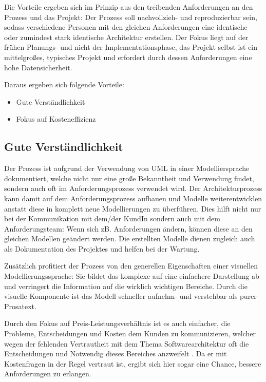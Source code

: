 Die Vorteile ergeben sich im Prinzip aus den treibenden Anforderungen an den Prozess und das Projekt: Der Prozess soll nachvollzieh- und reproduzierbar sein, sodass verschiedene Personen mit den gleichen Anforderungen eine identische oder zumindest stark identische Architektur erstellen. Der Fokus liegt auf der frühen Planungs- und nicht der Implementationsphase, das Projekt selbst ist ein mittelgroßes, typisches Projekt und erfordert durch dessen Anforderungen eine hohe Datensicherheit.

Daraus ergeben sich folgende Vorteile:

\begin{itemize}
  \item Gute Verständlichkeit
  \item Fokus auf Kosteneffizienz
\end{itemize}

\subsection{Gute Verständlichkeit}
Der Prozess ist aufgrund der Verwendung von UML in einer Modelliersprache dokumentiert, welche nicht nur eine große Bekanntheit und Verwendung findet, sondern auch oft im Anforderungsprozess verwendet wird. Der Architekturprozess kann damit auf dem Anforderungsprozess aufbauen und Modelle weiterentwicklen anstatt diese in komplett neue Modellierungen zu überführen. Dies hilft nicht nur bei der Kommunikation mit dem/der KundIn sondern auch mit dem Anforderungsteam: Wenn sich zB. Anforderungen ändern, können diese an den gleichen Modellen geändert werden. Die erstellten Modelle dienen zugleich auch als Dokumentation des Projektes und helfen bei der Wartung.

Zusätzlich profitiert der Prozess von den generellen Eigenschaften einer visuellen Modellierungssprache: Sie bildet das komplexe auf eine einfachere Darstellung ab und verringert die Information auf die wirklich wichtigen Bereiche. Durch die visuelle Komponente ist das Modell schneller aufnehm- und verstehbar als purer Prosatext.

Durch den Fokus auf Preis-Leistungsverhältnis ist es auch einfacher, die Probleme, Entscheidungen und Kosten dem Kunden zu kommunizieren, welcher wegen der fehlenden Vertrautheit mit dem Thema Softwarearchitektur oft die Entscheidungen und Notwendig dieses Bereiches anzweifelt \cite[S. 8-9]{softarch}. Da er mit Kostenfragen in der Regel vertraut ist, ergibt sich hier sogar eine Chance, bessere Anforderungen zu erlangen.

